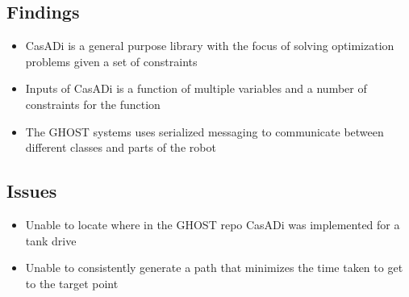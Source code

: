 \subsection*{Findings}
\begin{itemize}
    \item CasADi is a general purpose library with the focus of solving optimization problems given a set of constraints
    \item Inputs of CasADi is a function of multiple variables and a number of constraints for the function
    \item The GHOST systems uses serialized messaging to communicate between different classes and parts of the robot
\end{itemize}

\subsection*{Issues}
\begin{itemize}
    \item Unable to locate where in the GHOST repo CasADi was implemented for a tank drive
    \item Unable to consistently generate a path that minimizes the time taken to get to the target point
\end{itemize}

